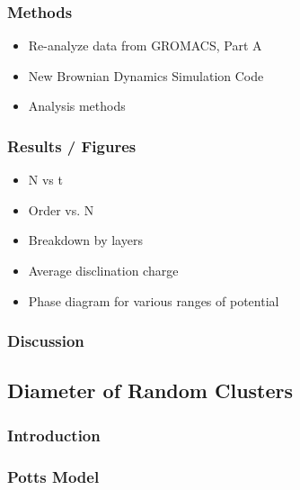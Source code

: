 \documentclass[11pt]{article}
\begin{document}
\subsubsection{Methods}
\label{sec-1_2_2}
\begin{itemize}

\item Re-analyze data from GROMACS, Part A\\
\label{sec-1_2_2_1}%
\item New Brownian Dynamics Simulation Code\\
\label{sec-1_2_2_2}%
\item Analysis methods\\
\label{sec-1_2_2_3}%
\end{itemize} %
\subsubsection{Results / Figures}
\label{sec-1_2_3}
\begin{itemize}

\item N vs t\\
\label{sec-1_2_3_1}%
\item Order vs. N\\
\label{sec-1_2_3_2}%
\item Breakdown by layers\\
\label{sec-1_2_3_3}%
\item Average disclination charge\\
\label{sec-1_2_3_4}%
\item Phase diagram for various ranges of potential\\
\label{sec-1_2_3_5}%
\end{itemize} %
\subsubsection{Discussion}
\label{sec-1_2_4}
\subsection{Diameter of Random Clusters}
\label{sec-1_3}
\subsubsection{Introduction}
\label{sec-1_3_1}
\subsubsection{Potts Model \cite{Wu82}}
\label{sec-1_3_2}
\end{document}
